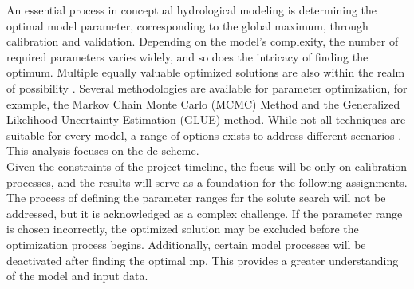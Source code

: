 An essential process in conceptual hydrological modeling is determining the optimal model parameter, corresponding to the global maximum, through calibration and validation. Depending on the model's complexity, the number of required parameters varies widely, and so does the intricacy of finding the optimum. Multiple equally valuable optimized solutions are also within the realm of possibility \autocite{Beven.2012}. Several methodologies are available for parameter optimization, for example, the Markov Chain Monte Carlo (MCMC)  Method and the Generalized Likelihood Uncertainty Estimation (GLUE) method. While not all techniques are suitable for every model, a range of options exists to address different scenarios \autocite{SPOTting}. This analysis focuses on the \ac{de} scheme. \\ 

Given the constraints of the project timeline, the focus will be only on calibration processes, and the results will serve as a foundation for the following assignments. The process of defining the parameter ranges for the solute search will not be addressed, but it is acknowledged as a complex challenge. If the parameter range is chosen incorrectly, the optimized solution may be excluded before the optimization process begins. Additionally, certain model processes will be deactivated after finding the optimal \ac{mp}. This provides a greater understanding of the model and input data. \\  

